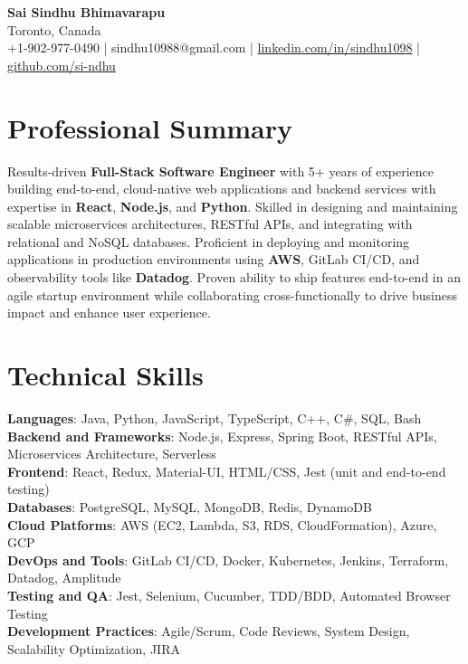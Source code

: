 \documentclass[letterpaper,11pt]{article}
\begin{document}
\begin{center}
  {\Large \textbf{Sai Sindhu Bhimavarapu}} \\
  Toronto, Canada \\
  +1-902-977-0490 \enspace | \enspace sindhu10988@gmail.com \enspace | \enspace \href{https://www.linkedin.com/in/sindhu1098/}{linkedin.com/in/sindhu1098} \enspace | \enspace \href{https://github.com/si-ndhu}{github.com/si-ndhu}
\end{center}

\section{Professional Summary}
  \begin{itemize}[leftmargin=0.15in, label={}]
    \small{\item{
     Results-driven \textbf{Full-Stack Software Engineer} with 5+ years of experience building end-to-end, cloud-native web applications and backend services with expertise in \textbf{React}, \textbf{Node.js}, and \textbf{Python}. Skilled in designing and maintaining scalable microservices architectures, RESTful APIs, and integrating with relational and NoSQL databases. Proficient in deploying and monitoring applications in production environments using \textbf{AWS}, GitLab CI/CD, and observability tools like \textbf{Datadog}. Proven ability to ship features end-to-end in an agile startup environment while collaborating cross-functionally to drive business impact and enhance user experience.
    }}
  \end{itemize}
\vspace{-16pt}

\section{Technical Skills}
 \begin{itemize}[leftmargin=0.15in, label={}]
    \small{\item{
     \textbf{Languages}: Java, Python, JavaScript, TypeScript, C++, C\#, SQL, Bash \\
     \textbf{Backend and Frameworks}: Node.js, Express, Spring Boot, RESTful APIs, Microservices Architecture, Serverless \\
     \textbf{Frontend}: React, Redux, Material-UI, HTML/CSS, Jest (unit and end-to-end testing) \\
     \textbf{Databases}: PostgreSQL, MySQL, MongoDB, Redis, DynamoDB \\
     \textbf{Cloud Platforms}: AWS (EC2, Lambda, S3, RDS, CloudFormation), Azure, GCP \\
     \textbf{DevOps and Tools}: GitLab CI/CD, Docker, Kubernetes, Jenkins, Terraform, Datadog, Amplitude \\
     \textbf{Testing and QA}: Jest, Selenium, Cucumber, TDD/BDD, Automated Browser Testing \\
     \textbf{Development Practices}: Agile/Scrum, Code Reviews, System Design, Scalability Optimization, JIRA
    }}
 \end{itemize}
\vspace{-16pt}
\end{document}
